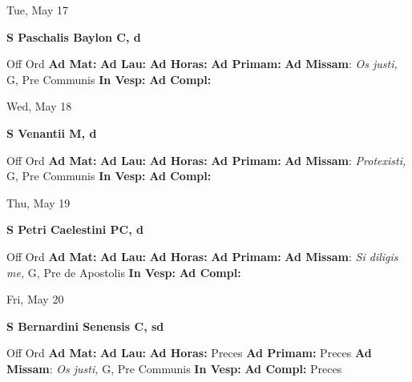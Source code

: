 \documentclass[10pt]{article}
\begin{document}
\begin{minipage}{3.5in}
\vspace{2em}\begin{center}
Tue, May 17
\end{center}\textbf{ \large S Paschalis Baylon C, \textnormal{\normalsize d}}
\begin{justify}
Off Ord
\textbf{Ad Mat: }
\textbf{Ad Lau: }
\textbf{Ad Horas: }
\textbf{Ad Primam: }
\textbf{Ad Missam}: \textit{Os justi,} G, Pre Communis
\textbf{In Vesp: }
\textbf{Ad Compl: }\end{justify}
\end{minipage}



\begin{minipage}{3.5in}
\vspace{2em}\begin{center}
Wed, May 18
\end{center}\textbf{ \large S Venantii M, \textnormal{\normalsize d}}
\begin{justify}
Off Ord
\textbf{Ad Mat: }
\textbf{Ad Lau: }
\textbf{Ad Horas: }
\textbf{Ad Primam: }
\textbf{Ad Missam}: \textit{Protexisti,} G, Pre Communis
\textbf{In Vesp: }
\textbf{Ad Compl: }\end{justify}
\end{minipage}



\begin{minipage}{3.5in}
\vspace{2em}\begin{center}
Thu, May 19
\end{center}\textbf{ \large S Petri Caelestini PC, \textnormal{\normalsize d}}
\begin{justify}
Off Ord
\textbf{Ad Mat: }
\textbf{Ad Lau: }
\textbf{Ad Horas: }
\textbf{Ad Primam: }
\textbf{Ad Missam}: \textit{Si diligis me,} G, Pre de Apostolis
\textbf{In Vesp: }
\textbf{Ad Compl: }\end{justify}
\end{minipage}



\begin{minipage}{3.5in}
\vspace{2em}\begin{center}
Fri, May 20
\end{center}\textbf{ \large S Bernardini Senensis C, \textnormal{\normalsize sd}}
\begin{justify}
Off Ord
\textbf{Ad Mat: }
\textbf{Ad Lau: }
\textbf{Ad Horas: }Preces
\textbf{Ad Primam: }Preces
\textbf{Ad Missam}: \textit{Os justi,} G, Pre Communis
\textbf{In Vesp: }
\textbf{Ad Compl: }Preces\end{justify}
\end{minipage}
\end{document}
